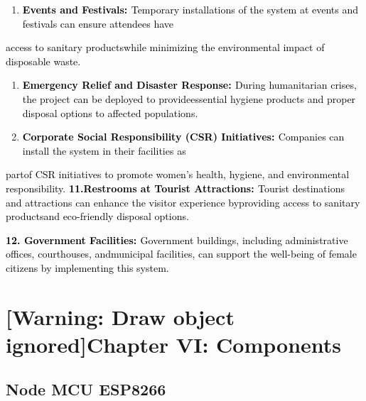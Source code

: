 \documentclass[letterpaper]{article}
\newcounter{saveenum}
\newcommand\liststyleWWNumiii{%
\renewcommand\theenumi{\arabic{enumi}}
\renewcommand\labelenumi{\theenumi.}
\renewcommand\labelitemi{{\textbullet}}
\renewcommand\labelitemii{{\textbullet}}
\renewcommand\labelitemiii{{\textbullet}}
}
\begin{document}
\liststyleWWNumiii
\setcounter{saveenum}{\value{enumi}}
\begin{enumerate}
\setcounter{enumi}{\value{saveenum}}
\item \textbf{\textcolor{black}{Events and Festivals: }}\textcolor{black}{Temporary installations of the system at
events and festivals can ensure attendees have}
\end{enumerate}

\bigskip

\textcolor{black}{access to sanitary productswhile minimizing the environmental impact of disposable waste.}

\liststyleWWNumiii
\setcounter{saveenum}{\value{enumi}}
\begin{enumerate}
\setcounter{enumi}{\value{saveenum}}
\item \textbf{\textcolor{black}{Emergency Relief and Disaster Response: }}\textcolor{black}{During humanitarian crises,
the project can be deployed to provideessential hygiene products and proper disposal options to affected populations.}
\item \textbf{\textcolor{black}{Corporate Social Responsibility (CSR) Initiatives: }}\textcolor{black}{Companies can
install the system in their facilities as}
\end{enumerate}
\textcolor{black}{partof CSR initiatives to promote women's health, hygiene, and environmental responsibility.
}\textbf{\textcolor{black}{11.Restrooms at Tourist Attractions: }}\textcolor{black}{Tourist destinations and
attractions can enhance the visitor experience byproviding access to sanitary productsand eco-friendly disposal
options.}

\textbf{\textcolor{black}{12. Government Facilities: }}\textcolor{black}{Government buildings, including administrative
offices, courthouses, andmunicipal facilities, can support the well-being of female citizens by implementing this
system.}

\clearpage\setcounter{page}{1}\pagestyle{Convertedxv}
\section[Chapter VI: Components]{[Warning: Draw object ignored]Chapter VI: Components}
\subsection{Node MCU ESP8266}

\bigskip


\bigskip
\end{document}
